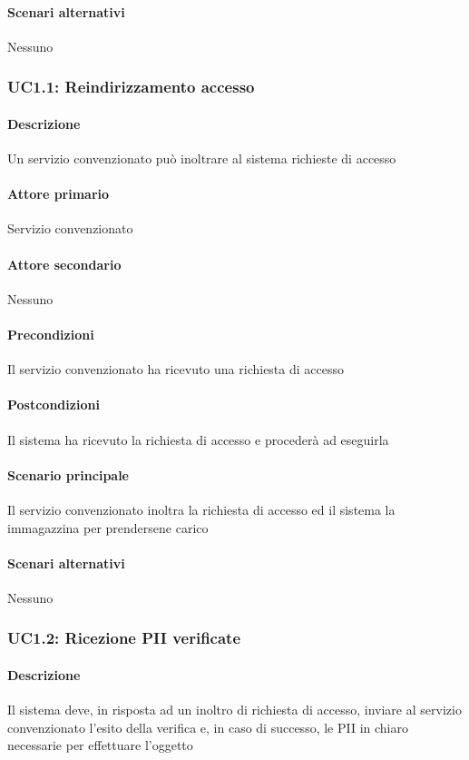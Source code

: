 \paragraph{Scenari alternativi}  Nessuno




\subsubsection{UC1.1: Reindirizzamento accesso}
\paragraph{Descrizione}  Un servizio convenzionato può inoltrare al sistema richieste di accesso
\paragraph{Attore primario}  Servizio convenzionato
\paragraph{Attore secondario}  Nessuno
\paragraph{Precondizioni}  Il servizio convenzionato ha ricevuto una richiesta di accesso
\paragraph{Postcondizioni}  Il sistema ha ricevuto la richiesta di accesso e procederà ad eseguirla
\paragraph{Scenario principale}  
Il servizio convenzionato inoltra la richiesta di accesso ed il sistema la immagazzina per prendersene carico
\paragraph{Scenari alternativi}  Nessuno



\subsubsection{UC1.2: Ricezione PII verificate}
\paragraph{Descrizione}  Il sistema deve, in risposta ad un inoltro di richiesta di accesso, inviare al servizio convenzionato l’esito della verifica e, in caso di successo, le PII in chiaro necessarie per effettuare l’oggetto
